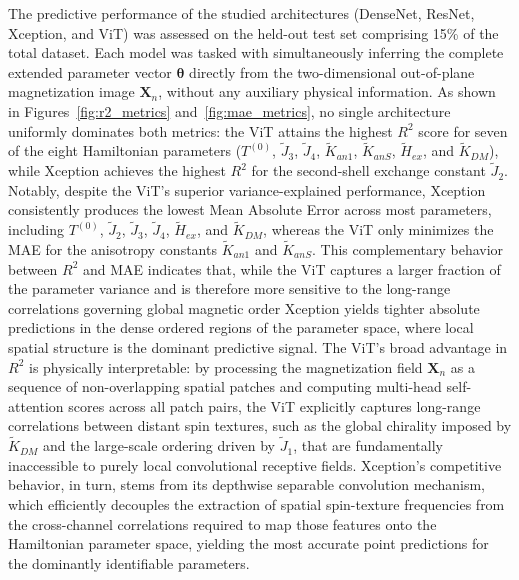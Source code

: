 \documentclass[a4paper,fleqn]{cas-sc}
\begin{document}
The predictive performance of the studied architectures (DenseNet,
ResNet, Xception, and ViT) was assessed on the held-out test set
comprising 15\% of the total dataset. Each model was tasked with
simultaneously inferring the complete extended parameter vector
$\boldsymbol{\theta}$ directly from the two-dimensional out-of-plane
magnetization image $\mathbf{X}_n$, without any auxiliary physical
information. As shown in Figures~\ref{fig:r2_metrics}
and~\ref{fig:mae_metrics}, no single architecture uniformly dominates
both metrics: the ViT attains the highest $R^2$ score for seven of the
eight Hamiltonian parameters ($T^{(0)}$, $\tilde{J}_3$, $\tilde{J}_4$,
$\tilde{K}_{an1}$, $\tilde{K}_{anS}$, $\tilde{H}_{ex}$, and
$\tilde{K}_{DM}$), while Xception achieves the highest $R^2$ for the
second-shell exchange constant $\tilde{J}_2$. Notably, despite the ViT's superior variance-explained
performance, Xception consistently produces the lowest Mean Absolute
Error across most parameters, including $T^{(0)}$, $\tilde{J}_2$,
$\tilde{J}_3$, $\tilde{J}_4$, $\tilde{H}_{ex}$, and $\tilde{K}_{DM}$,
whereas the ViT only minimizes the MAE for the anisotropy constants
$\tilde{K}_{an1}$ and $\tilde{K}_{anS}$. This complementary behavior
between $R^2$ and MAE indicates that, while the ViT captures a larger
fraction of the parameter variance and is therefore more sensitive
to the long-range correlations governing global magnetic order
Xception yields tighter absolute predictions in the dense ordered
regions of the parameter space, where local spatial structure is the
dominant predictive signal. The ViT's broad advantage in $R^2$ is
physically interpretable: by processing the magnetization field
$\mathbf{X}_n$ as a sequence of non-overlapping spatial patches and
computing multi-head self-attention scores across all patch pairs, the
ViT explicitly captures long-range correlations between distant spin
textures, such as the global chirality imposed by $\tilde{K}_{DM}$
and the large-scale ordering driven by $\tilde{J}_1$, that are
fundamentally inaccessible to purely local convolutional receptive
fields. Xception's competitive behavior, in turn, stems from its
depthwise separable convolution mechanism, which efficiently decouples
the extraction of spatial spin-texture frequencies from the
cross-channel correlations required to map those features onto the
Hamiltonian parameter space, yielding the most accurate point
predictions for the dominantly identifiable parameters.
\end{document}
